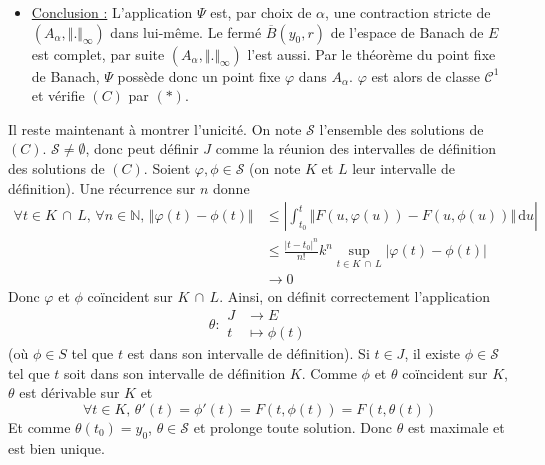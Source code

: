 \begin{demonstration}
\begin{itemize}
			\item \uline{Conclusion :} L'application $\Psi$ est, par choix de $\alpha$, une contraction stricte de $(A_\alpha, \Vert . \Vert_{\infty})$ dans lui-même. Le fermé $\overline{B}(y_0, r)$ de l'espace de Banach de $E$ est complet, par suite $(A_\alpha, \Vert . \Vert_{\infty})$ l'est aussi.
			\newpar
			Par le théorème du point fixe de Banach, $\Psi$ possède donc un point fixe $\varphi$ dans $A_\alpha$. $\varphi$ est alors de classe $\mathcal{C}^1$ et vérifie $(C)$ par $(*)$.
		\end{itemize}
		\medskip
		Il reste maintenant à montrer l'unicité. On note $\mathcal{S}$ l'ensemble des solutions de $(C)$. $\mathcal{S} \neq \emptyset$, donc peut définir $J$ comme la réunion des intervalles de définition des solutions de $(C)$.
		\newpar
		Soient $\varphi, \phi \in \mathcal{S}$ (on note $K$ et $L$ leur intervalle de définition). Une récurrence sur $n$ donne
		\begin{align*}
			\forall t \in K \, \cap \, L, \, \forall n \in \mathbb{N}, \, \Vert \varphi(t) - \phi(t) \Vert &\leq \left| \int_{t_0}^t \Vert F(u, \varphi(u)) - F(u, \phi(u)) \Vert \, \mathrm{d}u \right| \\
			&\leq \frac{|t-t_0|^n}{n!} k^n \sup_{t \in K \, \cap \, L} |\varphi(t) - \phi(t)| \\
			&\longrightarrow 0
		\end{align*}
		Donc $\varphi$ et $\phi$ coïncident sur $K \, \cap \, L$.
		\newpar
		Ainsi, on définit correctement l'application
		\[
		\theta :
		\begin{array}{cl}
			J &\rightarrow E \\
			t &\mapsto \phi(t)
		\end{array}
		\]
		(où $\phi \in S$ tel que $t$ est dans son intervalle de définition). Si $t \in J$, il existe $\phi \in \mathcal{S}$ tel que $t$ soit dans son intervalle de définition $K$. Comme $\phi$ et $\theta$ coïncident sur $K$, $\theta$ est dérivable sur $K$ et
		\[ \forall t \in K, \, \theta'(t) = \phi'(t) = F(t, \phi(t)) = F(t, \theta(t)) \]
		Et comme $\theta(t_0) = y_0$, $\theta \in \mathcal{S}$ et prolonge toute solution. Donc $\theta$ est maximale et est bien unique.
	\end{demonstration}

